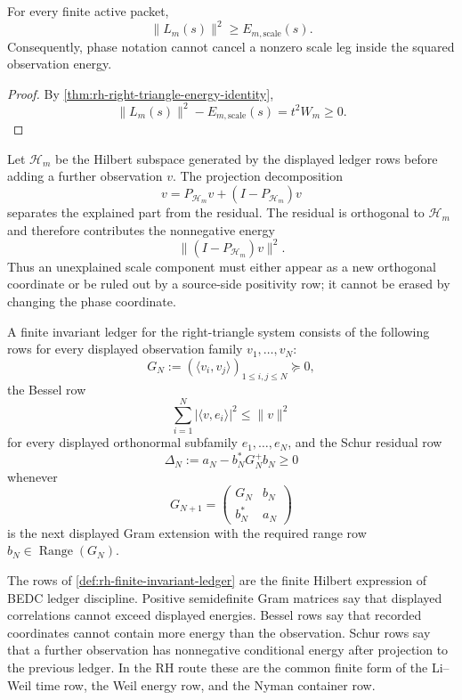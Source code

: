 \begin{corollary}
\label{cor:rh-scale-leg-lower-bound}
For every finite active packet,
$$
\|L_m(s)\|^2\ge E_{m,\mathrm{scale}}(s).
$$
Consequently, phase notation cannot cancel a nonzero scale leg inside
the squared observation energy.
\end{corollary}

\begin{proof}
By \autoref{thm:rh-right-triangle-energy-identity},
$$
\|L_m(s)\|^2-E_{m,\mathrm{scale}}(s)=t^2W_m\ge0.
$$
\end{proof}

\begin{principle}
\label{prin:rh-projection-residual-coordinate-creation}
Let $\mathcal H_m$ be the Hilbert subspace generated by the displayed
ledger rows before adding a further observation $v$.  The projection
decomposition
$$
v=P_{\mathcal H_m}v+(I-P_{\mathcal H_m})v
$$
separates the explained part from the residual.  The residual is
orthogonal to $\mathcal H_m$ and therefore contributes the nonnegative
energy
$$
\|(I-P_{\mathcal H_m})v\|^2.
$$
Thus an unexplained scale component must either appear as a new
orthogonal coordinate or be ruled out by a source-side positivity row;
it cannot be erased by changing the phase coordinate.
\end{principle}

\begin{definition}
\label{def:rh-finite-invariant-ledger}
A finite invariant ledger for the right-triangle system consists of the
following rows for every displayed observation family
$v_1,\ldots,v_N$:
$$
G_N:=(\langle v_i,v_j\rangle)_{1\le i,j\le N}\succeq0,
$$
the Bessel row
$$
\sum_{i=1}^N|\langle v,e_i\rangle|^2\le\|v\|^2
$$
for every displayed orthonormal subfamily $e_1,\ldots,e_N$, and the
Schur residual row
$$
\Delta_N:=a_N-b_N^\ast G_N^+b_N\ge0
$$
whenever
$$
G_{N+1}=
\begin{pmatrix}
G_N & b_N\\
b_N^\ast & a_N
\end{pmatrix}
$$
is the next displayed Gram extension with the required range row
$b_N\in\operatorname{Range}(G_N)$.
\end{definition}

\begin{principle}
\label{prin:rh-invariant-ledger-meaning}
The rows of \autoref{def:rh-finite-invariant-ledger} are the finite
Hilbert expression of BEDC ledger discipline.  Positive semidefinite
Gram matrices say that displayed correlations cannot exceed displayed
energies.  Bessel rows say that recorded coordinates cannot contain more
energy than the observation.  Schur rows say that a further observation
has nonnegative conditional energy after projection to the previous
ledger.  In the RH route these are the common finite form of the
Li--Weil time row, the Weil energy row, and the Nyman container row.
\end{principle}

